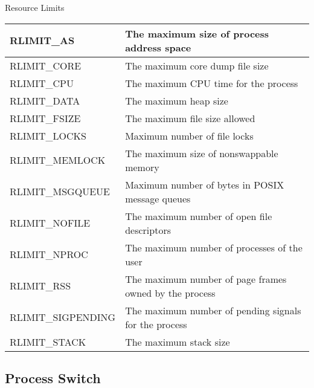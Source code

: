 \begin{frame}{Resource Limits}
  \begin{center}
    \begin{scriptsize}{\ttfamily
      \begin{tabular}{l|p{}}
        RLIMIT\_AS&The maximum size of process address space\\\hline
        RLIMIT\_CORE&The maximum core dump file size\\\hline
        RLIMIT\_CPU&The maximum CPU time for the process\\\hline
        RLIMIT\_DATA&The maximum heap size\\\hline
        RLIMIT\_FSIZE&The maximum file size allowed\\\hline
        RLIMIT\_LOCKS&Maximum number of file locks\\\hline
        RLIMIT\_MEMLOCK&The maximum size of nonswappable memory\\\hline
        RLIMIT\_MSGQUEUE&Maximum number of bytes in POSIX message queues\\\hline
        RLIMIT\_NOFILE&The maximum number of open file descriptors\\\hline
        RLIMIT\_NPROC&The maximum number of processes of the user\\\hline
        RLIMIT\_RSS&The maximum number of page frames owned by the process\\\hline
        RLIMIT\_SIGPENDING&The maximum number of pending signals for the process\\\hline
        RLIMIT\_STACK&The maximum stack size
      \end{tabular}}
    \end{scriptsize}
  \end{center}
\end{frame}

\subsection{Process Switch}

